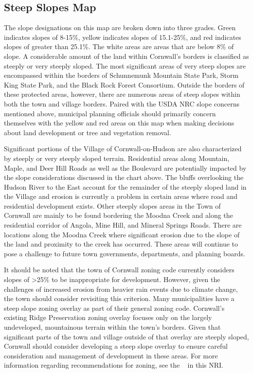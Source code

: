 \subsection*{Steep Slopes Map}\label{subsec:steepslopes}
The slope designations on this map are broken down into three grades. Green 
indicates slopes of 8-15\%, yellow indicates slopes of 15.1-25\%, and red 
indicates slopes of greater than 25.1\%. The white areas are areas that are 
below 8\% of slope. A considerable amount of the land within Cornwall's borders 
is classified as steeply or very steeply sloped. The most significant areas of 
very steep slopes are encompassed within the borders of Schunnemunk Mountain 
State Park, Storm King State Park, and the Black Rock Forest Consortium. 
Outside the borders of these protected areas, however, there are numerous areas 
of steep slopes within both the town and village borders. Paired with the USDA 
NRC slope concerns mentioned above, municipal planning officials should 
primarily concern themselves with the yellow and red areas on this map when 
making decisions about land development or tree and vegetation removal.

Significant portions of the Village of Cornwall-on-Hudson are also 
characterized by steeply or very steeply sloped terrain. Residential areas 
along Mountain, Maple, and Deer Hill Roads as well as the Boulevard are 
potentially impacted by the slope considerations discussed in the chart above. 
The bluffs overlooking the Hudson River to the East account for the remainder of 
the steeply sloped land in the Village and erosion is currently a problem in 
certain areas where road and residential development exists. Other steeply 
slopes areas in the Town of Cornwall are mainly to be found bordering the Moodna 
Creek and along the residential corridor of Angola, Mine Hill, and Mineral 
Springs Roads. There are locations along the Moodna Creek where significant 
erosion due to the slope of the land and proximity to the creek has occurred. 
These areas will continue to pose a challenge to future town governments, 
departments, and planning boards.

It should be noted that the town of Cornwall zoning code currently considers 
slopes of >25\% to be inappropriate for development. However, given the 
challenges of increased erosion from heavier rain events due to climate change, 
the town should consider revisiting this criterion. Many municipalities have a 
steep slope zoning overlay as part of their general zoning code. Cornwall's 
existing Ridge Preservation zoning overlay focuses only on the largely 
undeveloped, mountainous terrain within the town’s borders. Given that 
significant parts of the town and village outside of that overlay are steeply 
sloped, Cornwall should consider developing a steep slope overlay to ensure 
careful consideration and management of development in these areas. For more 
information regarding recommendations for zoning, see the ~
in this NRI.

